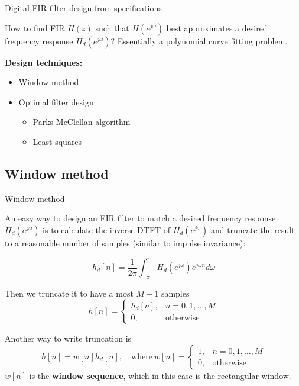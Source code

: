\documentclass[10pt]{beamer}
\begin{document}
%
\begin{frame}{Digital FIR filter design from specifications}
	
	How to find FIR $H(z)$ such that $H(e^{j\omega})$ best approximates a desired frequency response $H_d(e^{j\omega})$? Essentially a polynomial curve fitting problem.
	\begin{center}
		\resizebox{0.6\linewidth}{!}{}
	\end{center}
	
	\textbf{Design techniques:}
	\begin{itemize}
		\item Window method
		\item Optimal filter design
		\begin{itemize}
			\item Parks-McClellan algorithm
			\item Least squares
		\end{itemize}
	\end{itemize}
\end{frame}


\subsection{Window method}
%
\begin{frame}{Window method}

An easy way to design an FIR filter to match a desired frequency response $H_d(e^{j\omega})$ is to calculate the inverse DTFT of $H_d(e^{j\omega})$ and truncate the result to a reasonable number of samples (similar to impulse invariance):

\begin{equation}
	h_d[n] = \frac{1}{2\pi}\int_{-\pi}^{\pi}H_d(e^{j\omega})e^{j\omega n} d\omega \tag{inverse DTFT}
\end{equation}

Then we truncate it to have a most $M+1$ samples
\begin{equation}
	h[n] = \begin{cases}
	h_d[n], & n = 0, 1, \ldots, M \\
	0, & \text{otherwise}
	\end{cases} \tag{truncated sequence}
\end{equation} 

Another way to write truncation is 
\begin{equation*}
	h[n] = w[n]h_d[n], \quad\text{where}~w[n] = \begin{cases}
	1, & n = 0, 1, \ldots, M \\
	0, & \text{otherwise}
	\end{cases} \tag{truncated sequence}
\end{equation*}
$w[n]$ is the \textbf{window sequence}, which in this case is the rectangular window. 
\end{frame}
\end{document}
